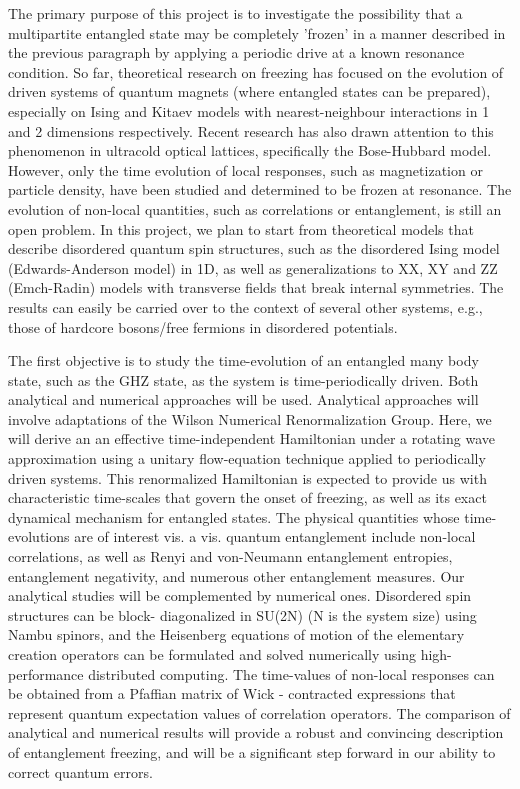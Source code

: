 \documentclass[a4paper,9pt]{article}
\begin{document}
The primary purpose of this project is to investigate the possibility that a multipartite entangled state may be completely 'frozen' in a manner described in the previous paragraph by applying a periodic drive at a known resonance condition. So far, theoretical research on freezing has focused on the evolution of driven systems of quantum magnets (where entangled states can be prepared), especially on Ising and Kitaev models with nearest-neighbour interactions in 1 and 2 dimensions respectively. Recent research has also drawn attention to this phenomenon in ultracold optical lattices, specifically the Bose-Hubbard model. However, only the time evolution of local responses, such as magnetization or particle density, have been studied and determined to be frozen at resonance. The evolution of non-local quantities, such as correlations or entanglement, is still an open problem. In this project, we plan to start from theoretical models that describe disordered quantum spin structures, such as the disordered 
Ising model (Edwards-Anderson model) in 1D, as well as generalizations to XX, XY and ZZ (Emch-Radin) models with transverse fields that break internal symmetries. The results can easily be carried over to the context of several other systems, e.g., those of hardcore bosons/free fermions in disordered potentials. 

The first objective is to study the time-evolution of an entangled many body state, such as the GHZ state,  as the system is time-periodically driven. Both analytical and numerical approaches will be used. Analytical approaches will involve adaptations of the Wilson Numerical Renormalization Group. Here, we will derive an  an effective time-independent Hamiltonian under a rotating wave approximation using a unitary flow-equation technique applied to periodically driven systems. This renormalized Hamiltonian is expected to provide us with characteristic time-scales that govern the onset of freezing, as well as its exact dynamical mechanism for entangled states. The physical quantities whose time-evolutions are of interest vis. a vis. quantum entanglement include non-local correlations, as well as Renyi and von-Neumann entanglement entropies, entanglement negativity, and numerous other entanglement measures. Our analytical studies will be complemented by numerical ones. Disordered spin structures can be block-
diagonalized in SU(2N) (N is the system size) using Nambu spinors, and the Heisenberg equations of motion of the elementary creation operators can be formulated and solved numerically using high- performance distributed computing. The time-values of non-local responses can be obtained from a Pfaffian matrix of Wick - contracted expressions that represent quantum expectation values of correlation operators. The comparison of analytical and numerical results will provide a robust and convincing description of entanglement freezing, and will be a significant step forward in our ability to correct quantum errors.
\end{document}
